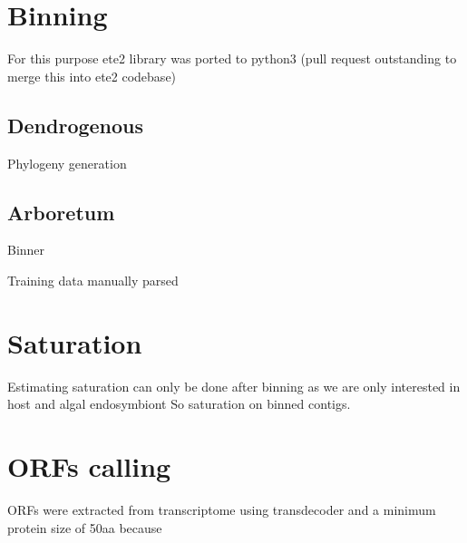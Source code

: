 \section{Binning}
For this purpose ete2 library was ported to python3 (pull request outstanding to merge this into ete2 codebase)
\subsection{Dendrogenous}
Phylogeny generation

\subsection{Arboretum}
Binner 

Training data manually parsed



\section{Saturation}
Estimating saturation can only be done after binning as we are only interested in host and algal endosymbiont
So saturation on binned contigs.


\section{ORFs calling}

ORFs were extracted from transcriptome using transdecoder and a minimum protein size of 50aa
because





